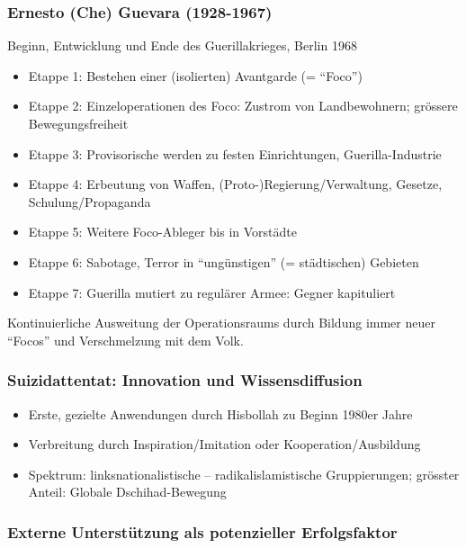 {}\documentclass[a4paper]{article}
\providecommand{\tightlist}{\setlength{\itemsep}{1mm}\setlength{\parskip}{1mm}}
\begin{document}
\subsubsection{Ernesto (Che) Guevara
	(1928-1967)}\label{ernesto-che-guevara-1928-1967}

Beginn, Entwicklung und Ende des Guerillakrieges, Berlin 1968

\begin{itemize}
	\tightlist
	\item
	      Etappe 1: Bestehen einer (isolierten) Avantgarde (= ``Foco'')
	\item
	      Etappe 2: Einzeloperationen des Foco: Zustrom von Landbewohnern;
	      grössere Bewegungsfreiheit
	\item
	      Etappe 3: Provisorische werden zu festen Einrichtungen,
	      Guerilla-Industrie
	\item
	      Etappe 4: Erbeutung von Waffen, (Proto-)Regierung/Verwaltung, Gesetze,
	      Schulung/Propaganda
	\item
	      Etappe 5: Weitere Foco-Ableger bis in Vorstädte
	\item
	      Etappe 6: Sabotage, Terror in ``ungünstigen'' (= städtischen) Gebieten
	\item
	      Etappe 7: Guerilla mutiert zu regulärer Armee: Gegner kapituliert
\end{itemize}

Kontinuierliche Ausweitung der Operationsraums durch Bildung immer neuer
``Focos'' und Verschmelzung mit dem Volk.

\subsubsection{Suizidattentat: Innovation und
	Wissensdiffusion}\label{suizidattentat-innovation-und-wissensdiffusion}

\begin{itemize}
	\tightlist
	\item
	      Erste, gezielte Anwendungen durch Hisbollah zu Beginn 1980er Jahre
	\item
	      Verbreitung durch Inspiration/Imitation oder Kooperation/Ausbildung
	\item
	      Spektrum: linksnationalistische -- radikalislamistische Gruppierungen;
	      grösster Anteil: Globale Dschihad-Bewegung
\end{itemize}

\subsubsection{Externe Unterstützung als potenzieller
	Erfolgsfaktor}\label{externe-unterstuxfctzung-als-potenzieller-erfolgsfaktor}
\end{document}
